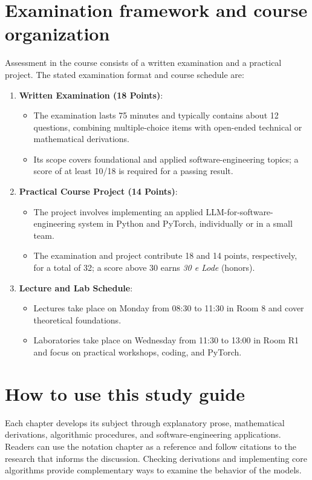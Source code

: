 \documentclass[../main.tex]{subfiles}
\begin{document}
\section*{Examination framework and course organization}
Assessment in the course consists of a written examination and a practical project. The stated examination format and course schedule are:
\begin{enumerate}
    \item \textbf{Written Examination (18 Points)}:
    \begin{itemize}
        \item The examination lasts 75 minutes and typically contains about 12 questions, combining multiple-choice items with open-ended technical or mathematical derivations.
        \item Its scope covers foundational and applied software-engineering topics; a score of at least 10/18 is required for a passing result.
    \end{itemize}
    \item \textbf{Practical Course Project (14 Points)}:
    \begin{itemize}
        \item The project involves implementing an applied LLM-for-software-engineering system in Python and PyTorch, individually or in a small team.
        \item The examination and project contribute 18 and 14 points, respectively, for a total of 32; a score above 30 earns \emph{30 e Lode} (honors).
    \end{itemize}
    \item \textbf{Lecture and Lab Schedule}:
    \begin{itemize}
        \item Lectures take place on Monday from 08:30 to 11:30 in Room 8 and cover theoretical foundations.
        \item Laboratories take place on Wednesday from 11:30 to 13:00 in Room R1 and focus on practical workshops, coding, and PyTorch.
    \end{itemize}
\end{enumerate}

\section*{How to use this study guide}
Each chapter develops its subject through explanatory prose, mathematical derivations, algorithmic procedures, and software-engineering applications. Readers can use the notation chapter as a reference and follow citations to the research that informs the discussion. Checking derivations and implementing core algorithms provide complementary ways to examine the behavior of the models.
\end{document}
